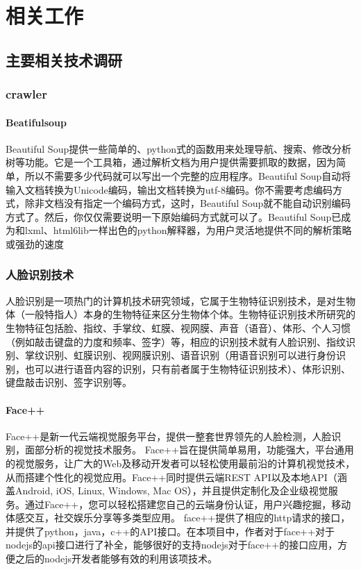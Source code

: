 
\chapter{相关工作}
\section{主要相关技术调研}
\subsection{crawler}
\subsubsection{Beatifulsoup}
Beautiful Soup提供一些简单的、python式的函数用来处理导航、搜索、修改分析树等功能。它是一个工具箱，通过解析文档为用户提供需要抓取的数据，因为简单，所以不需要多少代码就可以写出一个完整的应用程序。Beautiful Soup自动将输入文档转换为Unicode编码，输出文档转换为utf-8编码。你不需要考虑编码方式，除非文档没有指定一个编码方式，这时，Beautiful Soup就不能自动识别编码方式了。然后，你仅仅需要说明一下原始编码方式就可以了。Beautiful Soup已成为和lxml、html6lib一样出色的python解释器，为用户灵活地提供不同的解析策略或强劲的速度
\subsection{人脸识别技术}
人脸识别是一项热门的计算机技术研究领域，它属于生物特征识别技术，是对生物体（一般特指人）本身的生物特征来区分生物体个体。生物特征识别技术所研究的生物特征包括脸、指纹、手掌纹、虹膜、视网膜、声音（语音）、体形、个人习惯（例如敲击键盘的力度和频率、签字）等，相应的识别技术就有人脸识别、指纹识别、掌纹识别、虹膜识别、视网膜识别、语音识别（用语音识别可以进行身份识别，也可以进行语音内容的识别，只有前者属于生物特征识别技术）、体形识别、键盘敲击识别、签字识别等。
\subsubsection{Face++}
Face++是新一代云端视觉服务平台，提供一整套世界领先的人脸检测，人脸识别，面部分析的视觉技术服务。
Face++旨在提供简单易用，功能强大，平台通用的视觉服务，让广大的Web及移动开发者可以轻松使用最前沿的计算机视觉技术，从而搭建个性化的视觉应用。Face++同时提供云端REST API以及本地API（涵盖Android, iOS, Linux, Windows, Mac OS），并且提供定制化及企业级视觉服务。通过Face++，您可以轻松搭建您自己的云端身份认证，用户兴趣挖掘，移动体感交互，社交娱乐分享等多类型应用。
face++提供了相应的http请求的接口，并提供了python，java，c++的API接口。在本项目中，作者对于face++对于nodejs的api接口进行了补全，能够很好的支持nodejs对于face++的接口应用，方便之后的nodejs开发者能够有效的利用该项技术。

